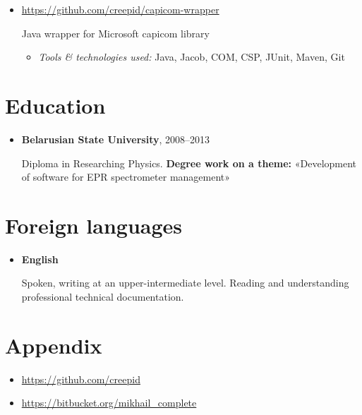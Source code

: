 \documentclass[a4paper, 12pt]{article}
\newcommand{\position}[1]{
    \textbf{#1}}
\newcommand{\itemlabel}[1]{
    \textit{#1:}}
\begin{document}
\begin{itemize}
            \item \href{https://github.com/creepid/capicom-wrapper}{https://github.com/creepid/capicom-wrapper}

           Java wrapper for Microsoft capicom library

            \begin{itemize}
                \item \itemlabel{Tools \& technologies used} Java, Jacob,  COM, CSP, JUnit, Maven, Git
            \end{itemize}
            
    \end{itemize}    

\section*{Education}

    \begin{itemize}

        \item \position{Belarusian State University}, 2008--2013

            Diploma in Researching Physics.
            \newline\textbf{Degree work on a theme:} 
            \newline «Development of software for EPR spectrometer management»
    \end{itemize}
    
\section*{Foreign languages}
 	\begin{itemize}
 		 \item \position{English}
 		 
 		 Spoken, writing at an upper-intermediate level. Reading and understanding professional technical documentation.  
 	\end{itemize}    
    
\section*{Appendix}

    \begin{itemize}
        \item \href{https://github.com/creepid}{https://github.com/creepid}
    \end{itemize}
        \begin{itemize}
        \item \href{https://bitbucket.org/mikhail_complete}{https://bitbucket.org/mikhail\_complete}
    \end{itemize}
\end{document}
